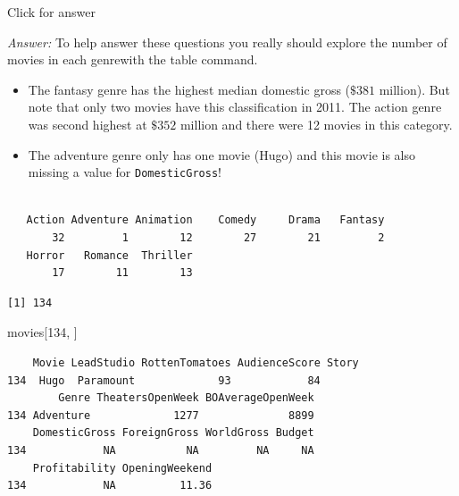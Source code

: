 \documentclass[
]{book}
\newenvironment{Shaded}{\begin{snugshade}}{\end{snugshade}}
\newcommand{\DecValTok}[1]{\textcolor[rgb]{0.00,0.00,0.81}{#1}}
\newcommand{\FunctionTok}[1]{\textcolor[rgb]{0.00,0.00,0.00}{#1}}
\newcommand{\NormalTok}[1]{#1}
\newcommand{\SpecialCharTok}[1]{\textcolor[rgb]{0.00,0.00,0.00}{#1}}
\newcommand{\StringTok}[1]{\textcolor[rgb]{0.31,0.60,0.02}{#1}}
\begin{document}
Click for answer

\emph{Answer:} To help answer these questions you really should explore the number of movies in each genrewith the table command.

\begin{itemize}
\item
  The fantasy genre has the highest median domestic gross (\(\$381\) million). But note that only two movies have this classification in 2011. The action genre was second highest at \(\$352\) million and there were 12 movies in this category.
\item
  The adventure genre only has one movie (Hugo) and this movie is also missing a value for \texttt{DomesticGross}!
\end{itemize}

\begin{Shaded}
\end{Shaded}

\begin{verbatim}

   Action Adventure Animation    Comedy     Drama   Fantasy 
       32         1        12        27        21         2 
   Horror   Romance  Thriller 
       17        11        13 
\end{verbatim}

\begin{Shaded}
\end{Shaded}

\begin{verbatim}
[1] 134
\end{verbatim}

\begin{Shaded}
\begin{Highlighting}[]
\NormalTok{movies[}\DecValTok{134}\NormalTok{, ]}
\end{Highlighting}
\end{Shaded}

\begin{verbatim}
    Movie LeadStudio RottenTomatoes AudienceScore Story
134  Hugo  Paramount             93            84      
        Genre TheatersOpenWeek BOAverageOpenWeek
134 Adventure             1277              8899
    DomesticGross ForeignGross WorldGross Budget
134            NA           NA         NA     NA
    Profitability OpeningWeekend
134            NA          11.36
\end{verbatim}
\end{document}
